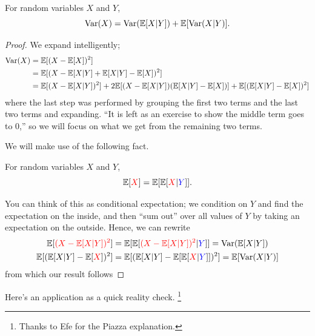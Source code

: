 \documentclass[11 pt]{scrartcl}
\begin{document}
\begin{theorem}
    For random variables $X$ and $Y$, 
    \[ \text{Var}(X) = \text{Var}(\mathbb E[X|Y]) + \mathbb E[\text{Var}(X|Y)].\] 
\end{theorem}
\begin{proof}
We expand intelligently; 
\begin{align*}
    \text{Var}(X) &= \mathbb E[(X-\mathbb E[X])^2] \\ 
            &= \mathbb E[(X - \mathbb E[X|Y] + \mathbb E[X|Y] - \mathbb E[X])^2] \\ 
            &= \mathbb E[(X-\mathbb E[X|Y])^2] + 2\mathbb E[(X-\mathbb E[X|Y])(\mathbb E[X|Y]-\mathbb E[X])] + \mathbb E[(\mathbb E[X|Y] - \mathbb E[X])^2] 
\end{align*}
where the last step was performed by grouping the first two terms and the last two terms and expanding. ``It is left as an exercise to show the middle term goes to 0,'' so we will focus on what we get from the remaining two terms. 

We will make use of the following fact. 

\begin{theorem}
    For random variables $X$ and $Y$, 
    \[ \mathbb E[{\color{red}X}] = \mathbb E[\mathbb E[{\color{red}X} | {\color{blue}Y}]].\] 
\end{theorem}

You can think of this as conditional expectation; we condition on $Y$ and find the expectation on the inside, and then ``sum out'' over all values of $Y$ by taking an expectation on the outside. Hence, we can rewrite 
\begin{align*}
    \mathbb E[{\color{red}(X-\mathbb E[X|Y])^2}] &= \mathbb E[\mathbb E[{\color{red}(X-\mathbb E[X|Y])^2} | {\color{blue}Y}]] = \text{Var}(\mathbb E[X|Y]) \\
\mathbb E[(\mathbb E[X|Y] - \mathbb E[{\color{red}X}])^2] &= \mathbb E[(\mathbb E[X|Y] - \mathbb E[\mathbb E[{\color{red}X}|{\color{blue}Y}]])^2] = \mathbb E[\text{Var}(X|Y)]
\end{align*}
from which our result follows 
\end{proof}

Here's an application as a quick reality check. \footnote{Thanks to Efe for the Piazza explanation.}
\end{document}
